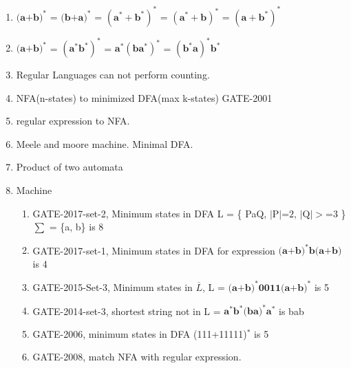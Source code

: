 \begin{enumerate}
    \item \( \mathbf { \text{(a+b)}^* } \) = \( \mathbf { \text{(b+a)}^* } \)
        = \( \mathbf { (\text{a}^* + \text{b}^*)^*} \) = \( \mathbf { (\text{a}^* + \text{b})^*} \)  = \( \mathbf { (\text{a} + \text{b}^*)^*} \)
    \item \( \mathbf { \text{(a+b)}^* } \) = \( \mathbf { (\text{a}^*\text{b}^*)^*} \) = \( \mathbf { \text{a}^* (\text{b}\text{a}^*)^* } \)
        = \( \mathbf { (\text{b}^*\text{a})^* \text{b}^* } \)
    \item Regular Languages can not perform counting.
    \item NFA(n-states) to minimized DFA(max k-states) GATE-2001
    \item regular expression to NFA.
    \item Meele and moore machine. Minimal DFA.
    \item Product of two automata
    \item Machine
    \begin{enumerate}
    \item GATE-2017-set-2, Minimum states in DFA \quad L = \{ PaQ,  \( |\text{P}|\text{=2, } | \text{Q}|>\text{=3} \) \}
          \quad \(\sum\) = \{a, b\} is 8
    \item GATE-2017-set-1, Minimum states in DFA for expression \( \mathbf { \text{(a+b)}^* \text{b} \text{(a+b)} } \)  is 4
    \item GATE-2015-Set-3, Minimum states in \( \overline{L} \), L = \( \mathbf { \text{(a+b)}^* \text{0011} \text{(a+b)}^* } \)  is 5
    \item GATE-2014-set-3, shortest string not in L =  \( \mathbf { \text{a}^*\text{b}^*\text{(ba)}^*\text{a}^*} \) is bab
    \item GATE-2006, minimum states in DFA (111+11111)\(^*\) is 5
    \item GATE-2008, match NFA with regular expression.

    \end{enumerate}
\end{enumerate}


\begin{comment}

    \( \mathbf {  } \)  \text{a}^\text{b}  \text{a}^*

    (00)^*   \lambda   \phi

\end{comment}
